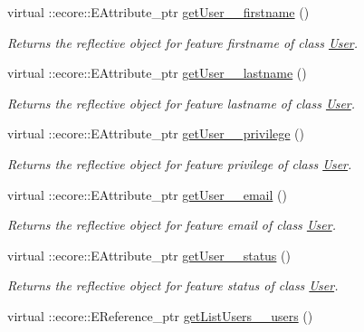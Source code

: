 \begin{DoxyCompactItemize}
virtual ::ecore::EAttribute\_\-ptr \hyperlink{classUMS__Data_1_1UMS__DataPackage_a0f898a948d0975b15f543f3d41f07ce4}{getUser\_\-\_\-firstname} ()
\begin{DoxyCompactList}\small\item\em Returns the reflective object for feature firstname of class \hyperlink{classUMS__Data_1_1User}{User}. \item\end{DoxyCompactList}\item 
virtual ::ecore::EAttribute\_\-ptr \hyperlink{classUMS__Data_1_1UMS__DataPackage_a770b1d0d3e77675f882f98a78b5453ae}{getUser\_\-\_\-lastname} ()
\begin{DoxyCompactList}\small\item\em Returns the reflective object for feature lastname of class \hyperlink{classUMS__Data_1_1User}{User}. \item\end{DoxyCompactList}\item 
virtual ::ecore::EAttribute\_\-ptr \hyperlink{classUMS__Data_1_1UMS__DataPackage_a19cf686dbc9c72aadc28515c3d7218d6}{getUser\_\-\_\-privilege} ()
\begin{DoxyCompactList}\small\item\em Returns the reflective object for feature privilege of class \hyperlink{classUMS__Data_1_1User}{User}. \item\end{DoxyCompactList}\item 
virtual ::ecore::EAttribute\_\-ptr \hyperlink{classUMS__Data_1_1UMS__DataPackage_a0489ee6587b45918a03ea15f8375a29a}{getUser\_\-\_\-email} ()
\begin{DoxyCompactList}\small\item\em Returns the reflective object for feature email of class \hyperlink{classUMS__Data_1_1User}{User}. \item\end{DoxyCompactList}\item 
virtual ::ecore::EAttribute\_\-ptr \hyperlink{classUMS__Data_1_1UMS__DataPackage_a98d730213010eee9a619b107765adc10}{getUser\_\-\_\-status} ()
\begin{DoxyCompactList}\small\item\em Returns the reflective object for feature status of class \hyperlink{classUMS__Data_1_1User}{User}. \item\end{DoxyCompactList}\item 
virtual ::ecore::EReference\_\-ptr \hyperlink{classUMS__Data_1_1UMS__DataPackage_ac7a6d778c00a2c58392c7c27033a1bae}{getListUsers\_\-\_\-users} ()

\end{DoxyCompactItemize}
